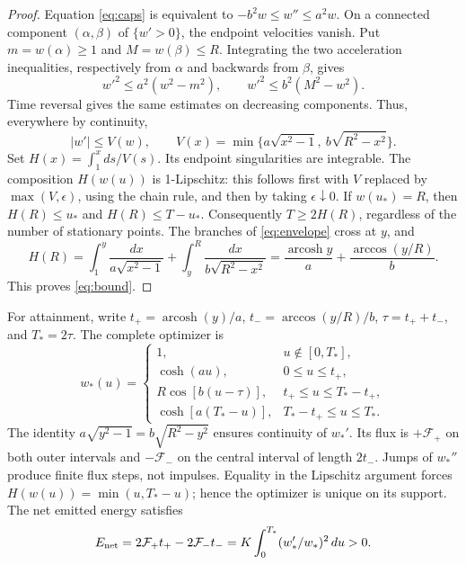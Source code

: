 \documentclass[10pt]{article}
\newcommand{\arcosh}{\operatorname{arcosh}}
\begin{document}
\begin{proof}
Equation \eqref{eq:caps} is equivalent to $-b^2w\le w''\le a^2w$.
On a connected component $(\alpha,\beta)$ of $\{w'>0\}$, the endpoint
velocities vanish. Put $m=w(\alpha)\ge1$ and $M=w(\beta)\le R$.
Integrating the two acceleration inequalities, respectively from $\alpha$
and backwards from $\beta$, gives
\begin{equation}
 w'^2\le a^2(w^2-m^2),\qquad
 w'^2\le b^2(M^2-w^2).
\end{equation}
Time reversal gives the same estimates on decreasing components. Thus,
everywhere by continuity,
\begin{equation}
 |w'|\le V(w),\qquad
 V(x)=\min\{a\sqrt{x^2-1},\ b\sqrt{R^2-x^2}\}.
 \label{eq:envelope}
\end{equation}
Set $H(x)=\int_1^x ds/V(s)$. Its endpoint singularities are integrable.
The composition $H(w(u))$ is 1-Lipschitz: this follows first with $V$ replaced
by $\max(V,\epsilon)$, using the chain rule, and then by taking
$\epsilon\downarrow0$. If $w(u_*)=R$, then $H(R)\le u_*$ and
$H(R)\le T-u_*$. Consequently $T\ge2H(R)$, regardless of the number of
stationary points. The branches of \eqref{eq:envelope} cross at $y$, and
\begin{equation}
 H(R)=\int_1^y\frac{dx}{a\sqrt{x^2-1}}
      +\int_y^R\frac{dx}{b\sqrt{R^2-x^2}}
 =\frac{\arcosh y}{a}+\frac{\arccos(y/R)}b.
\end{equation}
This proves \eqref{eq:bound}.
\end{proof}

For attainment, write $t_+=\arcosh(y)/a$, $t_-=\arccos(y/R)/b$,
$\tau=t_++t_-$, and $T_*=2\tau$. The complete optimizer is
\begin{equation}
 w_*(u)=
 \begin{cases}
  1,&u\notin[0,T_*],\\
  \cosh(au),&0\le u\le t_+,\\
  R\cos[b(u-\tau)],&t_+\le u\le T_*-t_+,\\
  \cosh[a(T_*-u)],&T_*-t_+\le u\le T_*.
 \end{cases}
 \label{eq:optimizer}
\end{equation}
The identity $a\sqrt{y^2-1}=b\sqrt{R^2-y^2}$ ensures continuity of $w_*'$.
Its flux is $+\mathcal F_+$ on both outer intervals and $-\mathcal F_-$
on the central interval of length $2t_-$. Jumps of $w_*''$ produce finite
flux steps, not impulses. Equality in the Lipschitz argument forces
$H(w(u))=\min(u,T_*-u)$; hence the optimizer is unique on its support.
The net emitted energy satisfies
\begin{equation}
 E_{\rm net}=2\mathcal F_+t_+-2\mathcal F_-t_-
 =K\int_0^{T_*}(w_*'/w_*)^2\,du>0.
 \label{eq:energy}
\end{equation}
\end{document}
